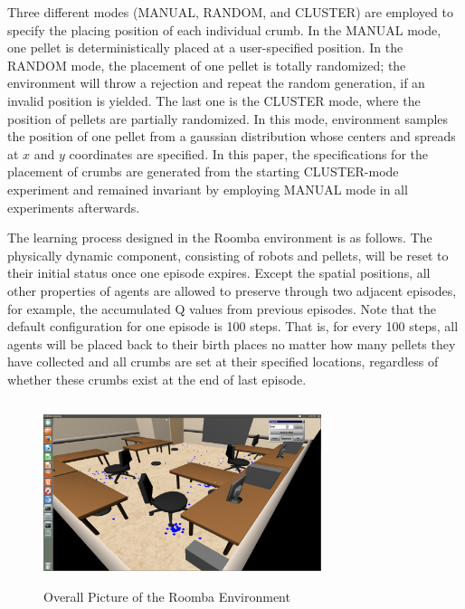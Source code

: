 \documentclass[conference]{IEEEtran}
\begin{document}
Three different modes (MANUAL, RANDOM, and CLUSTER) are employed to specify
the placing position of each individual crumb.
In the MANUAL mode, one pellet is deterministically placed at a user-specified
position. 
In the RANDOM mode, the placement of one pellet is totally randomized; the
environment will throw a rejection and repeat the random generation, if an
invalid position is yielded. The last one is the CLUSTER mode, where the
position of pellets are partially randomized. In this mode,
environment samples the position of one pellet from a gaussian distribution
whose centers and spreads at $x$ and $y$ coordinates are specified. 
In this paper, the specifications for the placement of crumbs are generated
from the starting CLUSTER-mode experiment and remained invariant by
employing MANUAL mode in all experiments afterwards.

The learning process designed in the Roomba environment is as follows. 
The physically dynamic component, consisting of robots and pellets, will be
reset to their initial status once one episode expires. 
Except the spatial positions, all other properties of agents are allowed to
preserve through two adjacent episodes, for example, the accumulated Q values
from previous episodes. 
Note that the default configuration for one episode is 100 steps. That is,
for every 100 steps, all agents will be placed back to their birth places no
matter how many pellets they have collected and all crumbs are set at
their specified locations, regardless of whether these crumbs exist at the end
of last episode. 

\begin{figure}[!t]
\centering
\includegraphics[width=3.2in,height=2.1in]{./figures/roombas/roomba2.png}
\caption{Overall Picture of the Roomba Environment}
\label{roomba:world}
\end{figure}
\end{document}
